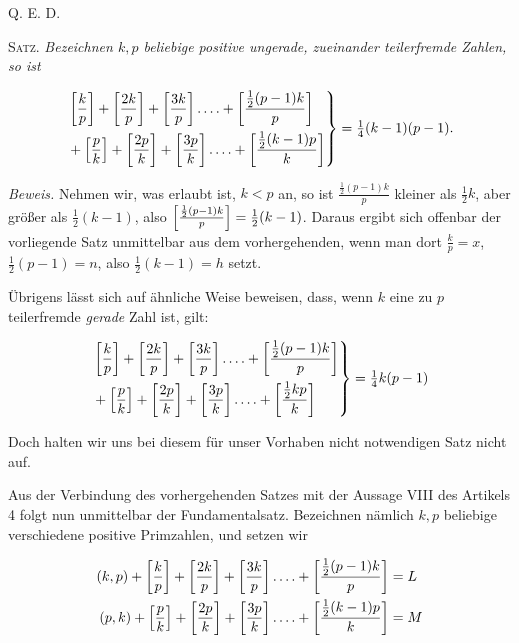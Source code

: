 Q. E. D.


\textsc{Satz.} \emph{Bezeichnen $k,p$ beliebige positive ungerade, zueinander teilerfremde Zahlen, so ist}

\[
\begin{aligned}
\left.\begin{aligned}
&\left[\frac kp\right]+\left[\frac{2k}{p}\right]+\left[\frac{3k}{p}\right]\mathinner{.\,.\,.\,.}+\left[\frac{\frac12(p-1)k}{p}\right]\\
&+\left[\frac pk\right]+\left[\frac{2p}{k}\right]+\left[\frac{3p}{k}\right]\mathinner{.\,.\,.\,.}+\left[\frac{\frac12(k-1)p}{k}\right]
\end{aligned}\right\}=\tfrac14(k-1)(p-1).
\end{aligned}
\]

\emph{Beweis.} Nehmen wir, was erlaubt ist, $k<p$ an, so ist $\frac{\frac12(p-1)k}{p}$ kleiner als $\frac12 k$, aber größer als $\frac12(k-1)$, also $\left[\frac{\frac12(p-1)k}{p}\right]=\frac12(k-1)$. Daraus ergibt sich offenbar der vorliegende Satz unmittelbar aus dem vorhergehenden, wenn man dort $\frac kp=x$, $\frac12(p-1)=n$, also $\frac12(k-1)=h$ setzt.

Übrigens lässt sich auf ähnliche Weise beweisen, dass, wenn $k$ eine zu $p$ teilerfremde \emph{gerade} Zahl ist, gilt:

\[
\begin{aligned}
\left.\begin{aligned}
&\left[\frac kp\right]+\left[\frac{2k}{p}\right]+\left[\frac{3k}{p}\right]\mathinner{.\,.\,.\,.}+\left[\frac{\frac12(p-1)k}{p}\right]\\
&+\left[\frac pk\right]+\left[\frac{2p}{k}\right]+\left[\frac{3p}{k}\right]\mathinner{.\,.\,.\,.}+\left[\frac{\frac12 kp}{k}\right]
\end{aligned}\right\}=\tfrac14 k(p-1)
\end{aligned}
\]

Doch halten wir uns bei diesem für unser Vorhaben nicht notwendigen Satz nicht auf.

\clearpage{}

Aus der Verbindung des vorhergehenden Satzes mit der Aussage VIII des Artikels 4 folgt nun unmittelbar der Fundamentalsatz. Bezeichnen nämlich $k,p$ beliebige verschiedene positive Primzahlen, und setzen wir

\[
\begin{aligned}
(k,p)+\left[\frac kp\right]+\left[\frac{2k}{p}\right]+\left[\frac{3k}{p}\right]\mathinner{.\,.\,.\,.}+\left[\frac{\frac12(p-1)k}{p}\right]&=L\\
(p,k)+\left[\frac pk\right]+\left[\frac{2p}{k}\right]+\left[\frac{3p}{k}\right]\mathinner{.\,.\,.\,.}+\left[\frac{\frac12(k-1)p}{k}\right]&=M
\end{aligned}
\]

